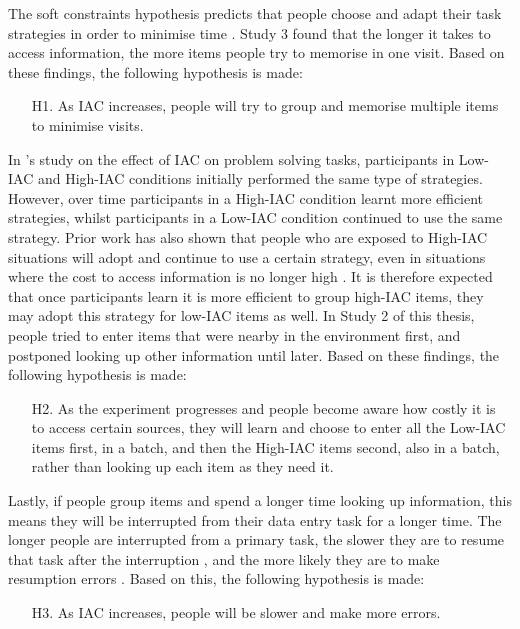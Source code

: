 \begin{table}
\begin{itemize}
The soft constraints hypothesis predicts that people choose and adapt their task strategies in order to minimise time \citep{Gray2006}. Study 3 found that the longer it takes to access information, the more items people try to memorise in one visit. Based on these findings, the following hypothesis is made: 
\begin{itemize}
\item[H1.]
As IAC increases, people will try to group and memorise multiple items to minimise visits.
\end{itemize}

In \citet{OHara1998}'s study on the effect of IAC on problem solving tasks, participants in Low-IAC and High-IAC conditions initially performed the same type of strategies. However, over time participants in a High-IAC condition  learnt more efficient strategies, whilst participants in a Low-IAC condition continued to use the same strategy. Prior work has also shown that people who are exposed to High-IAC situations will adopt and continue to use a certain strategy, even in situations where the cost to access information is no longer high \citep{Patrick2014}. It is therefore expected that once participants learn it is more efficient to group high-IAC items, they may adopt this strategy for low-IAC items as well. In Study 2 of this thesis, people tried to enter items that were nearby in the environment first, and postponed looking up other information until later. Based on these findings, the following hypothesis is made: 
\begin{itemize}
\item [H2.]
As the experiment progresses and people become aware how costly it is to access certain sources, they will learn and choose to enter all the Low-IAC items first, in a batch, and then the High-IAC items second, also in a batch, rather than looking up each item as they need it. 
\end{itemize}

Lastly, if people group items and spend a longer time looking up information, this means they will be interrupted from their data entry task for a longer time. The longer people are interrupted from a primary task, the slower they are to resume that task after the interruption \citep{Monk2008}, and the more likely they are to make resumption errors  \citep[e.g.][]{Brumby2013}. Based on this, the following hypothesis is made:
\begin{itemize}
\item[H3.]
As IAC increases, people will be slower and make more errors.
\end{itemize}


\end{itemize}
\end{table}
